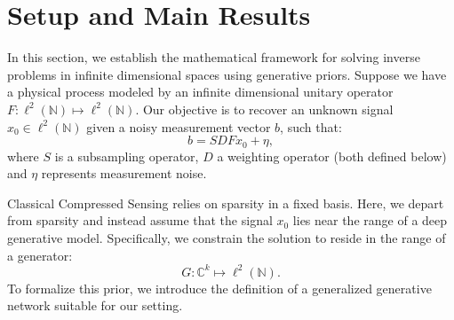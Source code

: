 \documentclass[a4paper,oneside]{amsart}
\newcommand{\lnn}{\ell^2(\mathbb{N})}
\begin{document}
\section{Setup and Main Results}\label{settupp}

In this section, we establish the mathematical framework for solving inverse problems in infinite dimensional spaces using generative priors. Suppose we have a physical process modeled by an infinite dimensional unitary operator $F \colon \lnn \longmapsto \lnn$. Our objective is to recover an unknown signal $x_0 \in \lnn$ given a noisy measurement vector $b$, such that:
\begin{equation*}
    b=SDFx_0 + \eta,
\end{equation*}
where $S$ is a subsampling operator, $D$ a weighting operator (both defined below) and $\eta$ represents measurement noise.

Classical Compressed Sensing relies on sparsity in a fixed basis. Here, we depart from sparsity and instead assume that the signal $x_0$ lies near the range of a deep generative model. Specifically, we constrain the solution to reside in the range of a generator:
\begin{equation*}
    G \colon \mathbb{C}^k \longmapsto \lnn.
\end{equation*}
To formalize this prior, we introduce the definition of a generalized generative network suitable for our setting.
\end{document}
